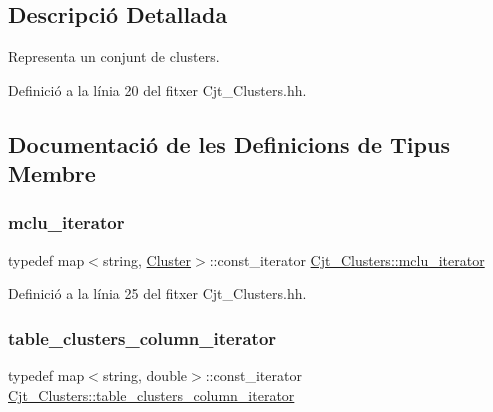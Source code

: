 \subsection{Descripció Detallada}
Representa un conjunt de clusters. 

Definició a la línia 20 del fitxer Cjt\+\_\+\+Clusters.\+hh.



\subsection{Documentació de les Definicions de Tipus Membre}
\mbox{\label{class_cjt___clusters_ad9cf46a8e1e6430c7b34b184f2756054}} 
\subsubsection{\texorpdfstring{mclu\+\_\+iterator}{mclu\_iterator}}
{\footnotesize\ttfamily typedef map$<$string, \hyperlink{class_cluster}{Cluster}$>$\+::const\+\_\+iterator \hyperlink{class_cjt___clusters_ad9cf46a8e1e6430c7b34b184f2756054}{Cjt\+\_\+\+Clusters\+::mclu\+\_\+iterator}\hspace{0.3cm}{\ttfamily [private]}}



Definició a la línia 25 del fitxer Cjt\+\_\+\+Clusters.\+hh.

\mbox{\label{class_cjt___clusters_abdef6142bd4683a878bb393a9095555e}} 
\subsubsection{\texorpdfstring{table\+\_\+clusters\+\_\+column\+\_\+iterator}{table\_clusters\_column\_iterator}}
{\footnotesize\ttfamily typedef map$<$string, double$>$\+::const\+\_\+iterator \hyperlink{class_cjt___clusters_abdef6142bd4683a878bb393a9095555e}{Cjt\+\_\+\+Clusters\+::table\+\_\+clusters\+\_\+column\+\_\+iterator}\hspace{0.3cm}{\ttfamily [private]}}



